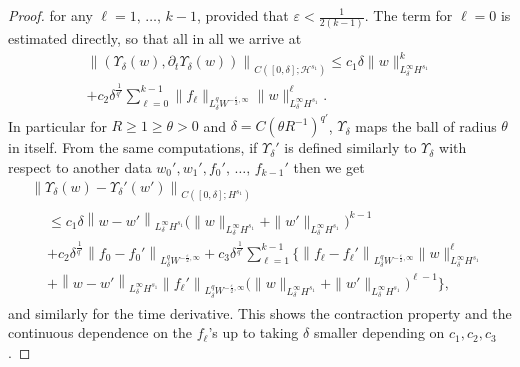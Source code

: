 \documentclass[AHL,Unicode,longabstracts,published]{cedram}
\renewcommand{\H}{\mathcal{H}}
\newcommand{\dl}{\delta}
\newcommand{\eps}{\varepsilon}
\newcommand{\dt}{\partial_t}
\begin{document}
\begin{proof}
for any $\ell=1,\,\dots,\,k-1$, provided that $\eps<\frac1{2(k-1)}$. The term for $\ell=0$ is estimated directly, so that all in all we arrive at
\begin{multline*}
\left\|\left(\Upsilon_{\dl}(w),\dt\Upsilon_\dl(w)\right)\right\|_{C\left([0,\dl]; \H^{s_1}\right)} \leq c_1\dl\|w\|_{L^{\infty}_{\dl} H^{s_1}}^{k}\\
+c_2\dl^{\frac1{q'}}\sum_{\ell=0}^{k-1}\|f_{\ell}\|_{L^{q}_{\dl}W^{-\frac\eps2,\infty}}\|w\|_{L^{\infty}_{\dl} H^{s_1}}^{\ell}.
\end{multline*}
In particular for $ R\geq 1\geq \theta>0$ and $\dl=C(\theta R^{-1})^{q'}$, $\Upsilon_{\dl}$ maps the ball of radius $\theta$ in itself. From the same computations, if $\Upsilon_{\dl}'$ is defined similarly to $\Upsilon_{\dl}$ with respect to another data $w_0',w_1',f_0',\,\dots,\,f_{k-1}'$ then we get
\begin{multline}\label{diff-Upsilon}
\left\|\Upsilon_{\dl}(w)-\Upsilon_{\dl}'(w')\right\|_{C\left([0,\dl]; H^{s_1}\right)}\\
\begin{aligned}
& \leq c_1\dl\left\|w-w'\right\|_{L^{\infty}_{\dl} H^{s_1}}\big(\|w\|_{L^{\infty}_{\dl} H^{s_1}}+\|w'\|_{L^{\infty}_{\dl} H^{s_1}}\big)^{k-1}\\
&+c_2\dl^{\frac1{q'}}\left\|f_{0}-f_{0}'\right\|_{L^{q}_{\dl}W^{-\frac\eps2,\infty}}+c_3\dl^{\frac1{q'}}\sum_{\ell=1}^{k-1}\Big\{\left\|f_{\ell}-f_{\ell}'\right\|_{L^{q}_{\dl}W^{-\frac\eps2,\infty}}\|w\|_{L^{\infty}_{\dl} H^{s_1}}^{\ell}\\
&+\left\|w-w'\right\|_{L^{\infty}_{\dl} H^{s_1}}\left\|f_{\ell}'\right\|_{L^{q}_{\dl}W^{-\frac\eps2,\infty}}\big(\|w\|_{L^{\infty}_{\dl} H^{s_1}}+\|w'\|_{L^{\infty}_{\dl} H^{s_1}}\big)^{\ell-1}\Big\},
\end{aligned}
\end{multline}
and similarly for the time derivative. This shows the contraction property and the continuous dependence on the $f_{\ell}$'s up to taking $\dl$ smaller depending on $c_1,c_2,c_3$.
\end{proof}
\end{document}
